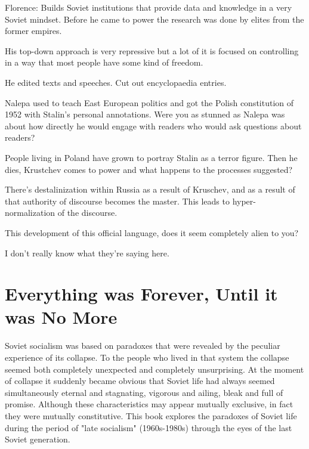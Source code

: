 \documentclass{article}
\begin{document}
\vspace{3mm}

Florence: Builds Soviet institutions that provide data and knowledge in a very Soviet mindset.  Before he came to power the research was done by elites from the former empires.  

\vspace{3mm}

His top-down approach is very repressive but a lot of it is focused on controlling in a way that most people have some kind of freedom.  

\vspace{3mm}

He edited texts and speeches.  Cut out encyclopaedia entries.  

\vspace{3mm}

Nalepa used to teach East European politics and got the Polish constitution of 1952 with Stalin's personal annotations.  Were you as stunned as Nalepa was about how directly he would engage with readers who would ask questions about readers? 

\vspace{3mm}

People living in Poland have grown to portray Stalin as a terror figure.  Then he dies, Krustchev comes to power and what happens to the processes suggested?  

\vspace{3mm}

There's destalinization within Russia as a result of Kruschev, and as a result of that authority of discourse becomes the master.  This leads to hyper-normalization of the discourse.  

\vspace{3mm}

This development of this official language, does it seem completely alien to you?  

\vspace{3mm}

I don't really know what they're saying here.  

\section{Everything was Forever, Until it was No More}

Soviet socialism was based on paradoxes that were revealed by the peculiar experience of its collapse. To the people who lived in that system the collapse seemed both completely unexpected and completely unsurprising. At the moment of collapse it suddenly became obvious that Soviet life had always seemed simultaneously eternal and stagnating, vigorous and ailing, bleak and full of promise. Although these characteristics may appear mutually exclusive, in fact they were mutually constitutive. This book explores the paradoxes of Soviet life during the period of "late socialism" (1960s-1980s) through the eyes of the last Soviet generation.
\end{document}
